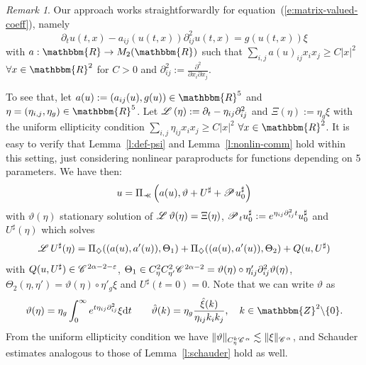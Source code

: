 \documentclass{amsart}
\newcommand{\assign}{:=}
\newcommand{\mathd}{\mathrm{d}}
\newcommand{\precprec}{\prec\!\!\!\prec}
\theoremstyle{remark}
\newtheorem{remark}[theorem]{Remark}
\theoremstyle{definition}
\newcommand{\CC}{\mathscr{C} \hspace{.1em}}
\newcommand{\LL}{\mathscr{L} \hspace{.2em}}
\newcommand{\PP}{\mathscr{P} \hspace{.1em}}
\begin{document}
\begin{remark}
  \label{r:vector-form}Our approach works straightforwardly for
  equation~(\ref{e:matrix-valued-coeff}), namely
  \[ \partial_t u (t, x) - a_{i j} (u (t, x)) \partial^2_{i j} u (t, x) = g (u
     (t, x)) \xi \]
  with $a : \mathbbm{R} \rightarrow M_2 (\mathbbm{R})$ such that $\sum_{i, j}
  a (u)_{i j} x_i x_j \geqslant C | x |^2$ $\forall x \in \mathbbm{R}^2$ for
  $C > 0$ and $\partial^2_{i j} \assign \frac{\partial^2}{\partial x_i
  \partial x_j}$.
  
  To see that, let $a (u) \assign (a_{i j} (u), g (u)) \in \mathbbm{R}^5$ and
  $\eta = (\eta_{i, j}, \eta_g) \in \mathbbm{R}^5$. Let $\LL (\eta) \assign
  \partial_t - \eta_{i j} \partial^2_{i j}$ and $\Xi (\eta) \assign \eta_g
  \xi$ with the uniform ellipticity condition $\sum_{i, j} \eta_{i j} x_i x_j
  \geqslant C | x |^2$ $\forall x \in \mathbbm{R}^2$. It is easy to verify
  that Lemma~\ref{l:def-psi} and Lemma~\ref{l:nonlin-comm} hold within this
  setting, just considering nonlinear paraproducts for functions depending on
  5 parameters. We have then:
  \[ u = \Pi_{\precprec} \left( a (u), \vartheta + U^{\sharp} + \PP
     u_0^{\sharp} \right) \]
  with $\vartheta (\eta)$ stationary solution of $\LL \vartheta (\eta) = \Xi
  (\eta)$, $\PP_t u_0^{\sharp} \assign e^{\eta_{i j} \partial^2_{i j} t}
  u_0^{\sharp}$ and $U^{\sharp} (\eta)$ which solves
  \[ \LL U^{\sharp} (\eta) = \Pi_{\diamondsuit} ((a (u), a' (u)), \Theta_1) +
     \Pi_{\diamondsuit} ((a (u), a' (u)), \Theta_2) + Q (u, U^{\sharp}) \]
  with $Q (u, U^{\sharp}) \in \CC^{2 \alpha - 2 - \varepsilon}$, $\Theta_1 \in
  C^2_{\eta} C^2_{\eta'} \CC^{2 \alpha - 2} = \vartheta (\eta) \circ \eta'_{i
  j} \partial^2_{i j} \vartheta (\eta)$, $\Theta_2 (\eta, \eta') = \vartheta
  (\eta) \circ \eta'_g \xi$ and $U^{\sharp} (t = 0) = 0$. Note that we can
  write $\vartheta$ as
  \[ \vartheta (\eta) = \eta_g \int_0^{\infty} e^{t \eta_{i j} \partial^2_{i
     j}} \xi \mathd t \qquad \hat{\vartheta} (k) = \eta_g \frac{\hat{\xi}
     (k)}{\eta_{i j} k_i k_j}, \quad k \in \mathbbm{Z}^2 \backslash \{ 0 \} .
  \]
  From the uniform ellipticity condition we have $\| \vartheta \|_{C_{\eta}^k
  \CC^{\alpha}} \lesssim \| \xi \|_{\CC^{\alpha}}$, and Schauder estimates
  analogous to those of Lemma~\ref{l:schauder} hold as well.
  

\end{remark}
\end{document}
